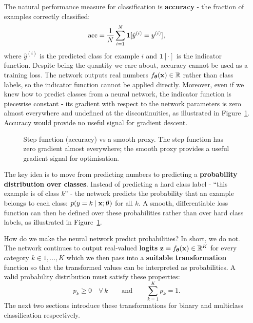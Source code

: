 The natural performance measure for classification is \textbf{accuracy} - the fraction of examples correctly classified:
\begin{equation}
    \text{acc} = \frac{1}{N}\sum_{i=1}^{N} \mathbf{1}[\hat{y}^{(i)} = y^{(i)}],
\end{equation}
where $\hat{y}^{(i)}$ is the predicted class for example $i$ and $\mathbf{1}[\cdot]$ is the indicator function. Despite being the quantity we care about, accuracy cannot be used as a training loss. The network outputs real numbers $f_{\boldsymbol{\theta}}(\mathbf{x}) \in \mathbb{R}$ rather than class labels, so the indicator function cannot be applied directly. Moreover, even if we knew how to predict classes from a neural network, the indicator function is piecewise constant - its gradient with respect to the network parameters is zero almost everywhere and undefined at the discontinuities, as illustrated in Figure~\ref{fig:step_vs_smooth}. Accuracy would provide no useful signal for gradient descent.

\begin{figure}
\centering
{}
\resizebox{0.36\textwidth}{!}{}
\caption{Step function (accuracy) vs a smooth proxy. The step function has zero gradient almost everywhere; the smooth proxy provides a useful gradient signal for optimisation.}
\label{fig:step_vs_smooth}
\end{figure}

The key idea is to move from predicting numbers to predicting a \textbf{probability distribution over classes}. Instead of predicting a hard class label - ``this example is of class $k$'' - the network predicts the probability that an example belongs to each class: $p(y = k \mid \mathbf{x}; \boldsymbol{\theta})$ for all $k$.
A smooth, differentiable loss function can then be defined over these probabilities rather than over hard class labels, as illustrated in Figure~\ref{fig:step_vs_smooth}.

How do we make the neural network predict probabilities? In short, we do not. The network continues to output real-valued \textbf{logits} $\mathbf{z} = f_{\boldsymbol{\theta}}(\mathbf{x}) \in \mathbb{R}^K$ for every category $k \in {1, \dots, K}$ which we then pass into a \textbf{suitable transformation} function so that the transformed values can be interpreted as probabilities.
 A valid probability distribution must satisfy these properties:
\begin{equation}
    p_k \geq 0 \quad \forall\, k \qquad \text{and} \qquad \sum_{k=1}^{K} p_k = 1.
\end{equation}
The next two sections introduce these transformations for binary and multiclass classification respectively.


